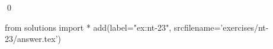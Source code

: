 
\begin{ex} 
  \label{ex:nt-23}
  
  \qed
\end{ex} 
\begin{python0}
from solutions import *
add(label="ex:nt-23",
    srcfilename='exercises/nt-23/answer.tex') 
\end{python0}
